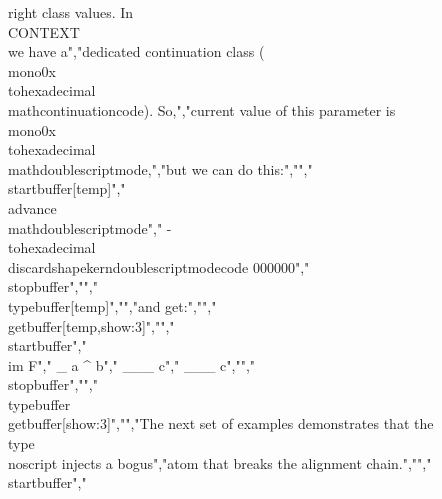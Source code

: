 right class values. In \\CONTEXT\\ we have a","dedicated continuation class (\\mono{0x\\tohexadecimal\\mathcontinuationcode}). So,","current value of this parameter is \\mono{0x\\tohexadecimal\\mathdoublescriptmode},","but we can do this:","","\\startbuffer[temp]","\\advance\\mathdoublescriptmode","   -\"\\tohexadecimal\\discardshapekerndoublescriptmodecode 000000","\\stopbuffer","","\\typebuffer[temp]","","and get:","","{\\getbuffer[temp,show:3]}","","\\startbuffer","\\im { F","    _ {a} ^ {b}","    ___ {c}","    ___ {c}","}","\\stopbuffer","","\\typebuffer \\getbuffer[show:3]","","The next set of examples demonstrates that the \\type {\\noscript} injects a bogus","atom that breaks the alignment chain.","","\\startbuffer","\\